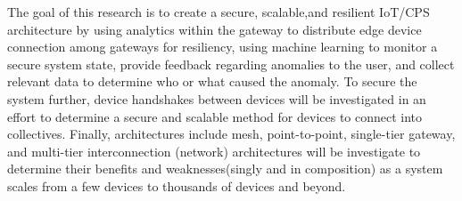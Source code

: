 \documentclass[../main.tex]{subfiles}
\begin{document}

The goal of this research is to create a secure, scalable,and resilient IoT/CPS architecture by using analytics within the gateway to distribute edge device connection among gateways for resiliency, using machine learning to monitor a secure system state, provide feedback regarding anomalies to the user, and collect relevant data to determine who or what caused the anomaly. To secure the system further, device handshakes between devices will be investigated in an effort to determine a secure and scalable method for devices to connect into collectives. Finally, architectures include mesh, point-to-point, single-tier gateway, and multi-tier 
interconnection (network) architectures will be investigate to determine their benefits and weaknesses(singly and in composition) as a system scales from a few devices to thousands of devices and beyond.
\end{document}
